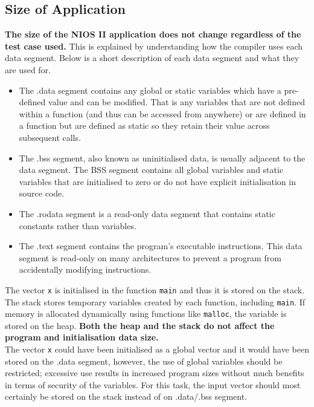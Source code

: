 \documentclass{article}
\begin{document}
\subsection{Size of Application}

\textbf{The size of the NIOS II application does not change regardless of the test case used.} This is explained by understanding how the compiler uses each data segment. Below is a short description of each data segment and what they are used for.
\begin{itemize}
    \item The .data segment contains any global or static variables which have a pre-defined value and can be modified. That is any variables that are not defined within a function (and thus can be accessed from anywhere) or are defined in a function but are defined as static so they retain their value across subsequent calls.
    \item The .bss segment, also known as uninitialised data, is usually adjacent to the data segment. The BSS segment contains all global variables and static variables that are initialised to zero or do not have explicit initialisation in source code.
    \item The .rodata segment is a read-only data segment that contains static constants rather than variables.
    \item The .text segment contains the program's executable instructions. This data segment is read-only on many architectures to prevent a program from accidentally modifying instructions.\cite{wiki}  
\end{itemize}

The vector {\tt x} is initialised in the function {\tt main} and thus it is stored on the stack. The stack stores temporary variables created by each function, including {\tt main}. If memory is allocated dynamically using functions like {\tt malloc}, the variable is stored on the heap. \textbf{Both the heap and the stack do not affect the program and initialisation data size.} \\

The vector {\tt x} could have been initialised as a global vector and it would have been stored on the .data segment, however, the use of global variables should be restricted; excessive use results in increased program sizes without much benefits in terms of security of the variables. For this task, the input vector should most certainly be stored on the stack instead of on .data/.bss segment.\\ 
\end{document}
